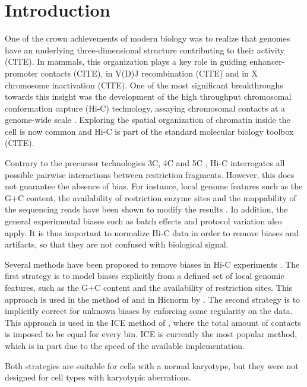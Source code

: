 \documentclass{bioinfo}
\begin{document}
\section{Introduction}

One of the crown achievements of modern biology was to realize that
genomes have an underlying three-dimensional structure contributing to
their activity (CITE). In mammals, this organization plays a key role in
guiding enhancer-promoter contacts (CITE), in V(D)J recombination (CITE)
and in X chromosome inactivation (CITE). One of the most significant
breakthroughs towards this insight was the development of the high
throughput chromosomal conformation capture (Hi-C) technology, assaying
chromosomal contacts at a genome-wide scale
\citep{lieberman2009comprehensive}. Exploring the spatial organization of
chromatin inside the cell is now common and Hi-C is part of the standard
molecular biology toolbox (CITE).

Contrary to the precursor technologies 3C, 4C and 5C \citep{de2012decade},
Hi-C interrogates all possible pairwise interactions between restriction
fragments. However, this does not guarantee the absence of bias. For
instance, local genome features such as the G+C content, the availability
of restriction enzyme sites and the mappability of the sequencing reads
have been shown to modify the results \citep{yaffe2011probabilistic}. In
addition, the general experimental biases such as batch effects and
protocol variation also apply. It is thus important to normalize
Hi-C data in order to remove biases and artifacts, so that they are not
confused with biological signal.

Several methods have been proposed to remove biases in Hi-C experiments
\citep{schmitt2016genome}. The first strategy is to model biases
explicitly from a defined set of local genomic features, such as the G+C
content and the availability of restriction sites. This approach is used
in the method of \cite{yaffe2011probabilistic} and in Hicnorm by
\cite{hu2012hicnorm}. The second strategy is to implicitly correct for
unknown biases by enforcing some regularity on the data. This approach is
used in the ICE method of \cite{imakaev2012iterative}, where the total
amount of contacts is imposed to be equal for every bin. ICE is currently
the most popular method, which is in part due to the speed of the
available implementation.

Both strategies are suitable for cells with a normal karyotype, but they
were not designed for cell types with karyotypic aberrations.
\end{document}
